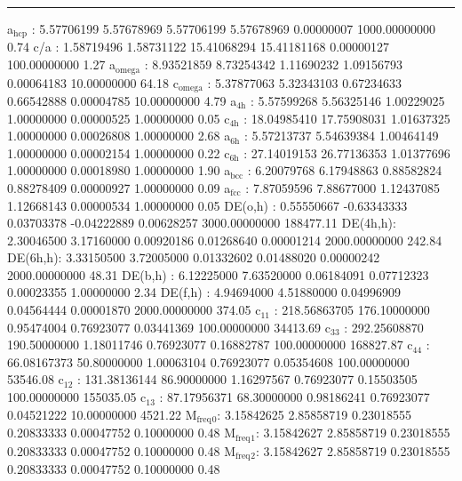 \documentclass[11pt]{article}
\begin{document}
\noindent\rule{\textwidth}{0.5pt}
a\(_{\text{hcp}}\)   :   5.57706199   5.57678969   5.57706199   5.57678969   0.00000007 1000.00000000         0.74
c/a     :   1.58719496   1.58731122  15.41068294  15.41181168   0.00000127 100.00000000         1.27
a\(_{\text{omega}}\) :   8.93521859   8.73254342   1.11690232   1.09156793   0.00064183  10.00000000        64.18
c\(_{\text{omega}}\) :   5.37877063   5.32343103   0.67234633   0.66542888   0.00004785  10.00000000         4.79
a\(_{\text{4h}}\)    :   5.57599268   5.56325146   1.00229025   1.00000000   0.00000525   1.00000000         0.05
c\(_{\text{4h}}\)    :  18.04985410  17.75908031   1.01637325   1.00000000   0.00026808   1.00000000         2.68
a\(_{\text{6h}}\)    :   5.57213737   5.54639384   1.00464149   1.00000000   0.00002154   1.00000000         0.22
c\(_{\text{6h}}\)    :  27.14019153  26.77136353   1.01377696   1.00000000   0.00018980   1.00000000         1.90
a\(_{\text{bcc}}\)   :   6.20079768   6.17948863   0.88582824   0.88278409   0.00000927   1.00000000         0.09
a\(_{\text{fcc}}\)   :   7.87059596   7.88677000   1.12437085   1.12668143   0.00000534   1.00000000         0.05
DE(o,h) :   0.55550667  -0.63343333   0.03703378  -0.04222889   0.00628257 3000.00000000    188477.11
DE(4h,h):   2.30046500   3.17160000   0.00920186   0.01268640   0.00001214 2000.00000000       242.84
DE(6h,h):   3.33150500   3.72005000   0.01332602   0.01488020   0.00000242 2000.00000000        48.31
DE(b,h) :   6.12225000   7.63520000   0.06184091   0.07712323   0.00023355   1.00000000         2.34
DE(f,h) :   4.94694000   4.51880000   0.04996909   0.04564444   0.00001870 2000.00000000       374.05
c\(_{\text{11}}\)    : 218.56863705 176.10000000   0.95474004   0.76923077   0.03441369 100.00000000     34413.69
c\(_{\text{33}}\)    : 292.25608870 190.50000000   1.18011746   0.76923077   0.16882787 100.00000000    168827.87
c\(_{\text{44}}\)    :  66.08167373  50.80000000   1.00063104   0.76923077   0.05354608 100.00000000     53546.08
c\(_{\text{12}}\)    : 131.38136144  86.90000000   1.16297567   0.76923077   0.15503505 100.00000000    155035.05
c\(_{\text{13}}\)    :  87.17956371  68.30000000   0.98186241   0.76923077   0.04521222  10.00000000      4521.22
M\(_{\text{freq}}\)\(_{\text{0}}\):   3.15842625   2.85858719   0.23018555   0.20833333   0.00047752   0.10000000         0.48
M\(_{\text{freq}}\)\(_{\text{1}}\):   3.15842627   2.85858719   0.23018555   0.20833333   0.00047752   0.10000000         0.48
M\(_{\text{freq}}\)\(_{\text{2}}\):   3.15842627   2.85858719   0.23018555   0.20833333   0.00047752   0.10000000         0.48
\end{document}
